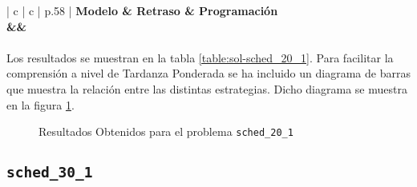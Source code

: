 \documentclass[spanish]{article}
\begin{document}
			\begin{table}
				\centering
				\begin{tabu}{ | c | c | p{.58\linewidth} |}
					\hline
					\bfseries Modelo & \bfseries Retraso & \bfseries Programación
					{\\\hline\model&\delay&\schedule}
					\\\hline
				\end{tabu}
				\caption{Resultados Obtenidos para el problema \texttt{sched\_20\_1}}
				\label{table:sol-sched_20_1}
			\end{table}

			\paragraph{}
			Los resultados se muestran en la tabla \ref{table:sol-sched_20_1}. Para facilitar la comprensión a nivel de Tardanza Ponderada se ha incluido un diagrama de barras que muestra la relación entre las distintas estrategias. Dicho diagrama se muestra en la figura \ref{plot:sol-sched_20_1}.

			\begin{figure}
				\begin{center}
				\end{center}
				\caption{Resultados Obtenidos para el problema \texttt{sched\_20\_1}}
				\label{plot:sol-sched_20_1}
			\end{figure}

		\subsection{\texttt{sched\_30\_1}}
\end{document}
